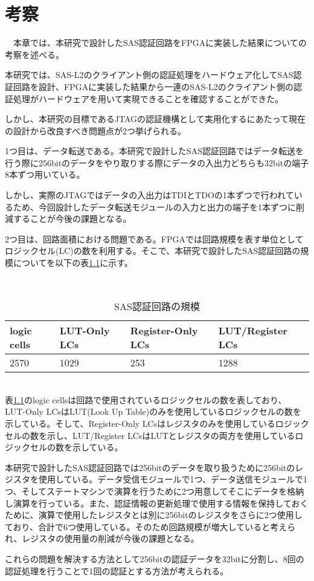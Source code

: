 \documentclass{thesis}
\begin{document}
\chapter{考察}
　本章では、本研究で設計したSAS認証回路をFPGAに実装した結果についての考察を述べる。\par
本研究では、SAS-L2のクライアント側の認証処理をハードウェア化してSAS認証回路を設計、FPGAに実装した結果から一連のSAS-L2のクライアント側の認証処理がハードウェアを用いて実現できることを確認することができた。\par
しかし、本研究の目標であるJTAGの認証機構として実用化するにあたって現在の設計から改良すべき問題点が2つ挙げられる。\par
1つ目は、データ転送である。本研究で設計したSAS認証回路ではデータ転送を行う際に256bitのデータをやり取りする際にデータの入出力どちらも32bitの端子8本ずつ用いている。\par
しかし、実際のJTAGではデータの入出力はTDIとTDOの1本ずつで行われているため、今回設計したデータ転送モジュールの入力と出力の端子を1本ずつに削減することが今後の課題となる。\par
2つ目は、回路面積における問題である。FPGAでは回路規模を表す単位としてロジックセル(LC)の数を利用する。そこで、本研究で設計したSAS認証回路の規模についてを以下の表\ref{logiccell}に示す。
\begin{table}[htb]
　\begin{center}
\caption{SAS認証回路の規模}
\label{logiccell}
  \begin{tabular}{|p{3cm}|p{3cm}|p{3cm}|p{3cm}|} \hline
   logic cells  &  LUT-Only LCs  &  Register-Only LCs  &  LUT/Register LCs  \\ \hline \hline
   2570  &  1029  &  253  &  1288 \\ \hline
  \end{tabular}
  \end{center}
\end{table}　\\

表\ref{logiccell}のlogic cellsは回路で使用されているロジックセルの数を表しており、 LUT-Only LCsはLUT(Look Up Table)のみを使用しているロジックセルの数を示している。そして、Register-Only LCsはレジスタのみを使用しているロジックセルの数を示し、LUT/Register LCsはLUTとレジスタの両方を使用しているロジックセルの数を示している。\par
本研究で設計したSAS認証回路では256bitのデータを取り扱うために256bitのレジスタを使用している。データ受信モジュールで1つ、データ送信モジュールで1つ、そしてステートマシンで演算を行うために2つ用意してそこにデータを格納し演算を行っている。また、認証情報の更新処理で使用する情報を保持しておくために、演算で使用したレジスタとは別に256bitのレジスタをさらに2つ使用しており、合計で6つ使用している。そのため回路規模が増大していると考えられ、レジスタの使用量の削減が今後の課題となる。\par
これらの問題を解決する方法として256bitの認証データを32bitに分割し、8回の認証処理を行うことで1回の認証とする方法が考えられる。
\end{document}
